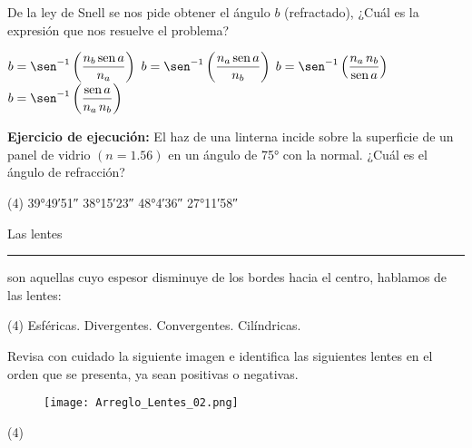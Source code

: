 \documentclass[12pt, letter]{exam}
\begin{document}
\begin{questions}
    \question De la ley de Snell se nos pide obtener el ángulo $b$ (refractado), ¿Cuál es la expresión que nos resuelve el problema?
    \begin{multicols}{2}
    \begin{tasks}
        \task $ b = \sen^{-1} \left(\dfrac{n_{b} \, \text{sen} \, a}{n_{a}} \right)$
        \task $ b = \sen^{-1} \left(\dfrac{n_{a} \, \text{sen} \, a}{n_{b}} \right)$
        \task $ b = \sen^{-1} \left(\dfrac{n_{a} \, n_{b}}{\text{sen} \, a} \right)$
        \task $ b = \sen^{-1} \left(\dfrac{\text{sen} \, a}{n_{a} \, n_{b}} \right)$
    \end{tasks}
    \end{multicols}
    \question \textbf{Ejercicio de ejecución: } El haz de una linterna incide sobre la superficie de un panel de vidrio $(n = 1.56)$ en un ángulo de \ang{75} con la normal. ¿Cuál es el ángulo de refracción?
    \begin{tasks}(4)
        \task \ang{39;49;51}
        \task \ang{38;15;23}
        \task \ang{48;4;36}
        \task \ang{27;11;58}
    \end{tasks}
    \question Las lentes \rule{2.5cm}{0.1mm} son aquellas cuyo espesor disminuye de los bordes hacia el centro, hablamos de las lentes:
    \begin{tasks}(4)
        \task Esféricas.
        \task Divergentes.
        \task Convergentes.
        \task Cilíndricas.
    \end{tasks}
    \question Revisa con cuidado la siguiente imagen e identifica las siguientes lentes en el orden que se presenta, ya sean positivas o negativas.
    \begin{figure}[H]
        \centering
        \texttt{[image: Arreglo\_Lentes\_02.png]}
    \end{figure}
    \begin{tasks}(4)

\end{tasks}
\end{questions}
\end{document}
